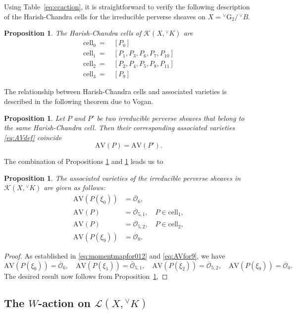 \documentclass[a4paper, 11pt]{article}
\newtheorem{prop}[theo]{Proposition}
\begin{document}
Using Table~\ref{eq:ccaction}, it is straightforward to verify the
following description of the Harish-Chandra cells for the irreducible
perverse sheaves on $X = {^\vee}\mathrm{G}_{2}/ \, {^\vee}B$.
\begin{prop}\label{prop:HCcells}
The Harish-Chandra cells of $\mathscr{K}(X, {^\vee}K)$ are 
\begin{align*}
\mathrm{cell}_0\ =& \ [P_{0}]\\
\mathrm{cell}_1\ =& \ [P_1,P_3,P_6,P_7,P_{10}] \\
\mathrm{cell}_2\ =& \ [P_2,P_4,P_5,P_8,P_{11}] \\
\mathrm{cell}_3\ =& \ [P_{9}]
\end{align*}
\end{prop}
The relationship between Harish-Chandra cells and associated varieties
is described in the following theorem due to Vogan. 
\begin{prop}\label{prop:Cell-AV0}
Let $P$ and $P'$ be two irreducible perverse sheaves
that belong to the same Harish-Chandra cell. Then their corresponding
associated varieties \eqref{eq:AVdef} coincide
$$\mathrm{AV}(P) = \mathrm{AV}(P').$$
\end{prop}
The combination of Propositions \ref{prop:HCcells} and \ref{prop:Cell-AV0}
leads us to
\begin{prop}\label{prop:Cells-AV}
The associated varieties of the irreducible perverse sheaves in
$\mathscr{K}(X, {^\vee}K)$ are given as follows:
\begin{align*}
\mathrm{AV}(P(\xi_0))&=\overline{\mathcal{O}}_{6},\\
 \mathrm{AV}(P)&=\overline{\mathcal{O}}_{5,1}, \quad P\in\mathrm{cell}_1,  \\ 
\mathrm{AV}(P)&=\overline{\mathcal{O}}_{5,2},
 \quad P\in\mathrm{cell}_2,\\
\mathrm{AV}(P(\xi_9))&=\overline{\mathcal{O}}_{0}. 
\end{align*}
\end{prop}
\begin{proof}
As established in \eqref{eq:momentmapfor012} and \eqref{eq:AVfor9}, we have
\[
\mathrm{AV}(P(\xi_0)) = \overline{\mathcal{O}}_{6}, \quad
\mathrm{AV}(P(\xi_1)) = \overline{\mathcal{O}}_{5,1}, \quad
\mathrm{AV}(P(\xi_2)) = \overline{\mathcal{O}}_{5,2}, \quad 
\mathrm{AV}(P(\xi_9)) = \overline{\mathcal{O}}_{0}.
\]
The desired result now follows from Proposition~\ref{prop:Cell-AV0},
\end{proof}

\subsection{The $W$-action on $\mathscr{L}(X, {^\vee}K)$}
\label{WactionL}
\end{document}
